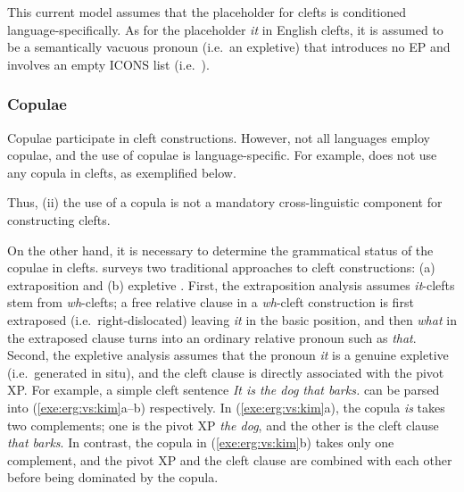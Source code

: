\noindent This current model assumes that the placeholder for clefts is
conditioned language-specifically. As for the placeholder \textit{it}
in English clefts, it is assumed to be a semantically vacuous pronoun
(i.e.\ an expletive) that introduces no EP and involves an empty ICONS
list (i.e.\ ).


\subsubsection{Copulae}
\label{10:sssec:clefts:cop}


Copulae participate in cleft constructions.  However, not all
languages employ copulae, and the use of copulae is
language-specific. For example,  does not use any copula
in clefts, as exemplified below.



\noindent Thus, (ii) the use of a copula is not a mandatory
cross-linguistic component for constructing clefts.


On the other hand, it is necessary to determine the grammatical status
of the copulae in clefts. \citet{kim:12a} surveys two
traditional approaches to cleft constructions: (a) extraposition
\citep{gundel:77} and (b) expletive \citep{kiss:99,lambrecht:01}.
First, the extraposition analysis assumes \textit{it}-clefts stem from
\textit{wh}-clefts; a free relative clause in a
\textit{wh}-cleft construction is first extraposed
(i.e.\ right-dislocated) leaving \textit{it} in the basic position,
and then \textit{what} in the extraposed clause turns into an ordinary
relative pronoun such as \textit{that}.  Second, the expletive
analysis assumes that the pronoun \textit{it} is a genuine expletive
(i.e.\ generated in situ), and the cleft clause is directly
associated with the pivot XP. For example, a simple cleft sentence
\textit{It is the dog that barks.}  can be parsed into
(\ref{exe:erg:vs:kim}a--b) respectively. In (\ref{exe:erg:vs:kim}a),
the copula \textit{is} takes two complements; one is the pivot XP
\textit{the dog}, and the other is the cleft clause \textit{that
  barks}. In contrast, the copula in (\ref{exe:erg:vs:kim}b) takes
only one complement, and the pivot XP and the cleft clause are
combined with each other before being dominated by the copula.


